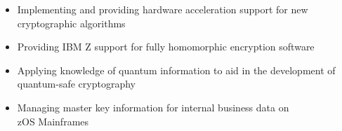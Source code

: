 \begin{itemize}
    \item Implementing and providing hardware acceleration support for new cryptographic algorithms
    \item Providing IBM Z support for fully homomorphic encryption software
    \item Applying knowledge of quantum information to aid in the development of quantum-safe cryptography
    \item Managing master key information for internal business data on \\zOS Mainframes
\end{itemize}